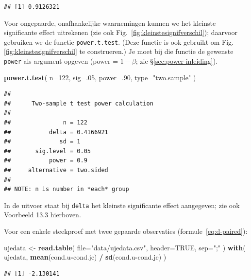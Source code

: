 \documentclass[
]{book}
\newenvironment{Shaded}{\begin{snugshade}}{\end{snugshade}}
\newcommand{\DataTypeTok}[1]{\textcolor[rgb]{0.13,0.29,0.53}{#1}}
\newcommand{\DecValTok}[1]{\textcolor[rgb]{0.00,0.00,0.81}{#1}}
\newcommand{\KeywordTok}[1]{\textcolor[rgb]{0.13,0.29,0.53}{\textbf{#1}}}
\newcommand{\NormalTok}[1]{#1}
\newcommand{\OperatorTok}[1]{\textcolor[rgb]{0.81,0.36,0.00}{\textbf{#1}}}
\newcommand{\OtherTok}[1]{\textcolor[rgb]{0.56,0.35,0.01}{#1}}
\newcommand{\StringTok}[1]{\textcolor[rgb]{0.31,0.60,0.02}{#1}}
\begin{document}
\begin{verbatim}
## [1] 0.9126321
\end{verbatim}

Voor ongepaarde, onafhankelijke waarnemingen kunnen we het kleinste
significante effect uitrekenen (zie ook
Fig.~\ref{fig:kleinstesignifverschil}); daarvoor gebruiken we de functie \texttt{power.t.test}. (Deze functie is ook gebruikt om Fig.\ref{fig:kleinstesignifverschil} te construeren.)
Je moet bij die functie de gewenste \texttt{power} als
argument opgeven (power = \(1-\beta\); zie
§\ref{sec:power-inleiding}).

\begin{Shaded}
\begin{Highlighting}[]
\KeywordTok{power.t.test}\NormalTok{( }\DataTypeTok{n=}\DecValTok{122}\NormalTok{, }\DataTypeTok{sig=}\NormalTok{.}\DecValTok{05}\NormalTok{, }\DataTypeTok{power=}\NormalTok{.}\DecValTok{90}\NormalTok{, }\DataTypeTok{type=}\StringTok{"two.sample"}\NormalTok{ )}
\end{Highlighting}
\end{Shaded}

\begin{verbatim}
## 
##      Two-sample t test power calculation 
## 
##               n = 122
##           delta = 0.4166921
##              sd = 1
##       sig.level = 0.05
##           power = 0.9
##     alternative = two.sided
## 
## NOTE: n is number in *each* group
\end{verbatim}

In de uitvoer staat bij \texttt{delta} het kleinste significante effect aangegeven; zie ook Voorbeeld 13.3 hierboven.

Voor een enkele steekproef met twee gepaarde observaties
(formule~\eqref{eq:d-paired}):

\begin{Shaded}
\begin{Highlighting}[]
\NormalTok{ujedata \textless{}{-}}\StringTok{ }\KeywordTok{read.table}\NormalTok{( }\DataTypeTok{file=}\StringTok{"data/ujedata.csv"}\NormalTok{, }\DataTypeTok{header=}\OtherTok{TRUE}\NormalTok{, }\DataTypeTok{sep=}\StringTok{";"}\NormalTok{ )}
\KeywordTok{with}\NormalTok{( ujedata, }\KeywordTok{mean}\NormalTok{(cond.u}\OperatorTok{{-}}\NormalTok{cond.je) }\OperatorTok{/}\StringTok{ }\KeywordTok{sd}\NormalTok{(cond.u}\OperatorTok{{-}}\NormalTok{cond.je) )}
\end{Highlighting}
\end{Shaded}

\begin{verbatim}
## [1] -2.130141
\end{verbatim}
\end{document}

